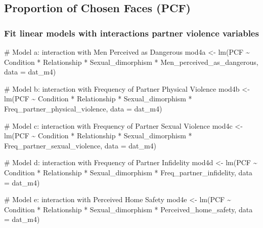 \documentclass[
  bookmarksnumbered]{article}
\newenvironment{Shaded}{\begin{snugshade}}{\end{snugshade}}
\newcommand{\AttributeTok}[1]{\textcolor[rgb]{0.80,0.80,0.80}{#1}}
\newcommand{\CommentTok}[1]{\textcolor[rgb]{0.50,0.62,0.50}{#1}}
\newcommand{\FunctionTok}[1]{\textcolor[rgb]{0.94,0.94,0.56}{#1}}
\newcommand{\NormalTok}[1]{\textcolor[rgb]{0.80,0.80,0.80}{#1}}
\newcommand{\OtherTok}[1]{\textcolor[rgb]{0.94,0.94,0.56}{#1}}
\newcommand{\SpecialCharTok}[1]{\textcolor[rgb]{0.86,0.64,0.64}{#1}}
\begin{document}
\subsection{Proportion of Chosen Faces (PCF)}\label{proportion-of-chosen-faces-pcf-1}

\subsubsection{Fit linear models with interactions partner violence variables}\label{fit-linear-models-with-interactions-partner-violence-variables-3}

\begin{Shaded}
\begin{Highlighting}[]
\CommentTok{\# Model a: interaction with Men Perceived as Dangerous}
\NormalTok{mod4a }\OtherTok{\textless{}{-}} \FunctionTok{lm}\NormalTok{(PCF }\SpecialCharTok{\textasciitilde{}}
\NormalTok{              Condition }\SpecialCharTok{*}\NormalTok{ Relationship }\SpecialCharTok{*}\NormalTok{ Sexual\_dimorphism }\SpecialCharTok{*}\NormalTok{ Men\_perceived\_as\_dangerous,}
            \AttributeTok{data =}\NormalTok{ dat\_m4)}

\CommentTok{\# Model b: interaction with Frequency of Partner Physical Violence}
\NormalTok{mod4b }\OtherTok{\textless{}{-}} \FunctionTok{lm}\NormalTok{(PCF }\SpecialCharTok{\textasciitilde{}}
\NormalTok{              Condition }\SpecialCharTok{*}\NormalTok{ Relationship }\SpecialCharTok{*}\NormalTok{ Sexual\_dimorphism }\SpecialCharTok{*}\NormalTok{ Freq\_partner\_physical\_violence,}
            \AttributeTok{data =}\NormalTok{ dat\_m4)}

\CommentTok{\# Model c: interaction with Frequency of Partner Sexual Violence}
\NormalTok{mod4c }\OtherTok{\textless{}{-}} \FunctionTok{lm}\NormalTok{(PCF }\SpecialCharTok{\textasciitilde{}}
\NormalTok{              Condition }\SpecialCharTok{*}\NormalTok{ Relationship }\SpecialCharTok{*}\NormalTok{ Sexual\_dimorphism }\SpecialCharTok{*}\NormalTok{ Freq\_partner\_sexual\_violence,}
            \AttributeTok{data =}\NormalTok{ dat\_m4)}

\CommentTok{\# Model d: interaction with Frequency of Partner Infidelity}
\NormalTok{mod4d }\OtherTok{\textless{}{-}} \FunctionTok{lm}\NormalTok{(PCF }\SpecialCharTok{\textasciitilde{}}
\NormalTok{              Condition }\SpecialCharTok{*}\NormalTok{ Relationship }\SpecialCharTok{*}\NormalTok{ Sexual\_dimorphism }\SpecialCharTok{*}\NormalTok{ Freq\_partner\_infidelity,}
            \AttributeTok{data =}\NormalTok{ dat\_m4)}

\CommentTok{\# Model e: interaction with Perceived Home Safety}
\NormalTok{mod4e }\OtherTok{\textless{}{-}} \FunctionTok{lm}\NormalTok{(PCF }\SpecialCharTok{\textasciitilde{}}
\NormalTok{              Condition }\SpecialCharTok{*}\NormalTok{ Relationship }\SpecialCharTok{*}\NormalTok{ Sexual\_dimorphism }\SpecialCharTok{*}\NormalTok{ Perceived\_home\_safety,}
            \AttributeTok{data =}\NormalTok{ dat\_m4)}
\end{Highlighting}
\end{Shaded}
\end{document}
